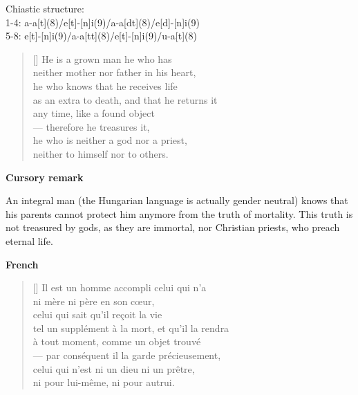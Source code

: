 \documentclass[a4paper,12pt,twoside,final]{book}
\begin{document}
\noindent Chiastic structure: \\
1-4: a-a[t](8)/e[t]-[n]i(9)/a-a[dt](8)/e[d]-[n]i(9) \\
5-8: e[t]-[n]i(9)/a-a[tt](8)/e[t]-[n]i(9)/u-a[t](8)

\newpage


\settowidth{\versewidth}{he who knows that he receives so much life}

\begin{verse}[\versewidth]
  He is a grown man he who has \\
  neither mother nor father in his heart, \\
  he who knows that he receives life \\
  as an extra to death, and that he returns it \\
  any time, like a found object \\
  --- therefore he treasures it, \\
  he who is neither a god nor a priest, \\
  neither to himself nor to others. \\
\end{verse}

\bigskip

\noindent \textbf{Cursory remark}

\medskip

An integral man (the Hungarian language is actually gender neutral)
knows that his parents cannot protect him anymore from the truth of
mortality. This truth is not treasured by gods, as they are immortal,
nor Christian priests, who preach eternal life.

\bigskip

\noindent \textbf{French}


\settowidth{\versewidth}{tel un supplément à la mort, et qu'il la rendra}

\begin{verse}[\versewidth]
  Il est un homme accompli celui qui n'a \\
  ni mère ni père en son cœur, \\
  celui qui sait qu'il reçoit la vie \\
  tel un supplément à la mort, et qu'il la rendra \\
  à tout moment, comme un objet trouvé \\
  --- par conséquent il la garde précieusement, \\
  celui qui n'est ni un dieu ni un prêtre, \\
  ni pour lui-même, ni pour autrui. \\
\end{verse}
\end{document}
